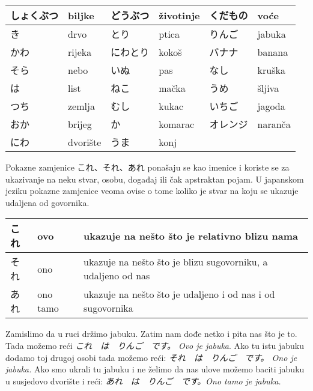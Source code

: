 
\author{Tomislav Mamić, Željka Ludošan}


	
	\vspace{10pt}
	\begin{tabular}{|l|l|l||l||l||l|}
		\hline
		しょくぶつ&biljke&どうぶつ&životinje&くだもの&voće\\\hline
		き&drvo&とり&ptica&りんご&jabuka\\\hline
		かわ&rijeka&にわとり&kokoš&バナナ&banana\\\hline
		そら&nebo&いぬ&pas&なし&kruška\\\hline
		は&list&ねこ&mačka&うめ&šljiva\\\hline
		つち&zemlja&むし&kukac&いちご&jagoda\\\hline
		おか&brijeg&か&komarac&オレンジ&naranča\\\hline
		にわ&dvorište&うま&konj&&\\\hline
	\end{tabular}
	\vspace{10pt}

	

	Pokazne zamjenice これ、それ、あれ ponašaju se kao imenice i koriste se za ukazivanje na neku stvar, osobu, događaj ili čak apstraktan pojam. U japanskom jeziku pokazne zamjenice veoma ovise o tome koliko je stvar na koju se ukazuje udaljena od govornika.
	
	\vspace{10pt}
	\begin{tabular}{|l|l|l|}
		\hline
		これ&ovo&ukazuje na nešto što je relativno blizu nama\\\hline
		それ&ono&ukazuje na nešto što je blizu sugovorniku, a udaljeno od nas\\\hline
		あれ&ono tamo&ukazuje na nešto što je udaljeno i od nas i od sugovornika\\\hline
	\end{tabular}
	\vspace{10pt}
	
	Zamislimo da u ruci držimo jabuku. Zatim nam dođe netko i pita nas što je to.
	Tada možemo reći \textit{これ　は　りんご　です。 Ovo je jabuka}. Ako tu istu jabuku dodamo toj drugoj osobi tada možemo reći:	\textit{それ　は　りんご　です。 Ono je jabuka.} Ako smo ukrali tu jabuku i ne želimo da nas ulove možemo baciti jabuku u susjedovo dvorište i reći: \textit{あれ　は　りんご　です。Ono tamo je jabuka.}
	

